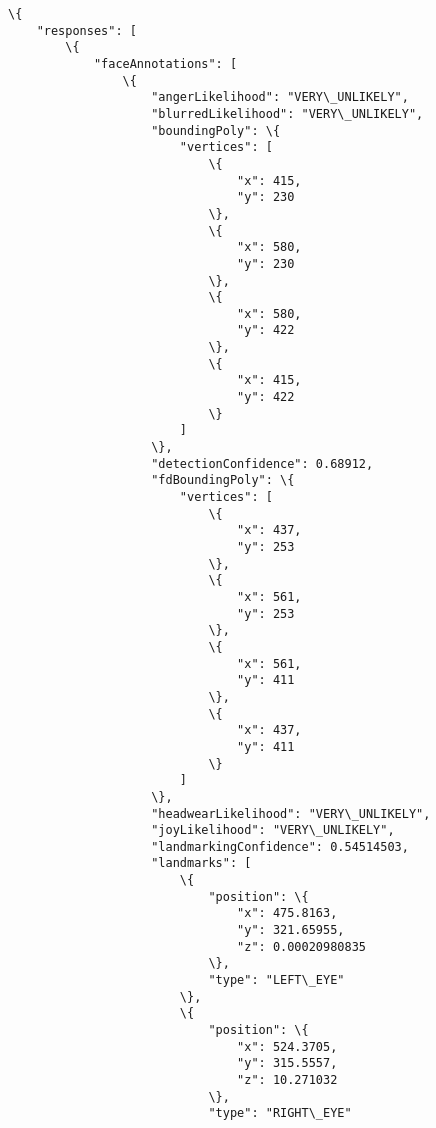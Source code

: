 \documentclass[11pt]{article}
\begin{document}
    \begin{Verbatim}[commandchars=\\\{\}]
\{
    "responses": [
        \{
            "faceAnnotations": [
                \{
                    "angerLikelihood": "VERY\_UNLIKELY",
                    "blurredLikelihood": "VERY\_UNLIKELY",
                    "boundingPoly": \{
                        "vertices": [
                            \{
                                "x": 415,
                                "y": 230
                            \},
                            \{
                                "x": 580,
                                "y": 230
                            \},
                            \{
                                "x": 580,
                                "y": 422
                            \},
                            \{
                                "x": 415,
                                "y": 422
                            \}
                        ]
                    \},
                    "detectionConfidence": 0.68912,
                    "fdBoundingPoly": \{
                        "vertices": [
                            \{
                                "x": 437,
                                "y": 253
                            \},
                            \{
                                "x": 561,
                                "y": 253
                            \},
                            \{
                                "x": 561,
                                "y": 411
                            \},
                            \{
                                "x": 437,
                                "y": 411
                            \}
                        ]
                    \},
                    "headwearLikelihood": "VERY\_UNLIKELY",
                    "joyLikelihood": "VERY\_UNLIKELY",
                    "landmarkingConfidence": 0.54514503,
                    "landmarks": [
                        \{
                            "position": \{
                                "x": 475.8163,
                                "y": 321.65955,
                                "z": 0.00020980835
                            \},
                            "type": "LEFT\_EYE"
                        \},
                        \{
                            "position": \{
                                "x": 524.3705,
                                "y": 315.5557,
                                "z": 10.271032
                            \},
                            "type": "RIGHT\_EYE"

\end{Verbatim}
\end{document}
